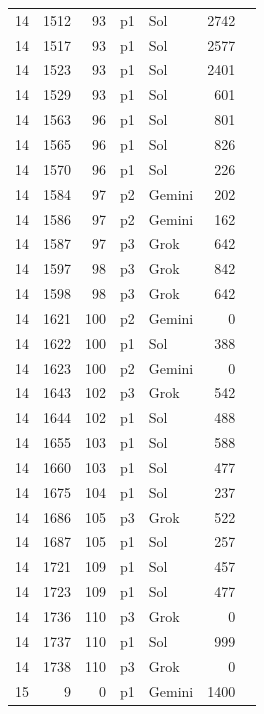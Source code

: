 \begin{longtable}{r r r l l r L{2.3in}}
14 & 1512 & 93 & p1 & Sol & 2742 &  \\
14 & 1517 & 93 & p1 & Sol & 2577 &  \\
14 & 1523 & 93 & p1 & Sol & 2401 &  \\
14 & 1529 & 93 & p1 & Sol & 601 &  \\
14 & 1563 & 96 & p1 & Sol & 801 &  \\
14 & 1565 & 96 & p1 & Sol & 826 &  \\
14 & 1570 & 96 & p1 & Sol & 226 &  \\
14 & 1584 & 97 & p2 & Gemini & 202 &  \\
14 & 1586 & 97 & p2 & Gemini & 162 &  \\
14 & 1587 & 97 & p3 & Grok & 642 &  \\
14 & 1597 & 98 & p3 & Grok & 842 &  \\
14 & 1598 & 98 & p3 & Grok & 642 &  \\
14 & 1621 & 100 & p2 & Gemini & 0 &  \\
14 & 1622 & 100 & p1 & Sol & 388 &  \\
14 & 1623 & 100 & p2 & Gemini & 0 &  \\
14 & 1643 & 102 & p3 & Grok & 542 &  \\
14 & 1644 & 102 & p1 & Sol & 488 &  \\
14 & 1655 & 103 & p1 & Sol & 588 &  \\
14 & 1660 & 103 & p1 & Sol & 477 &  \\
14 & 1675 & 104 & p1 & Sol & 237 &  \\
14 & 1686 & 105 & p3 & Grok & 522 &  \\
14 & 1687 & 105 & p1 & Sol & 257 &  \\
14 & 1721 & 109 & p1 & Sol & 457 &  \\
14 & 1723 & 109 & p1 & Sol & 477 &  \\
14 & 1736 & 110 & p3 & Grok & 0 &  \\
14 & 1737 & 110 & p1 & Sol & 999 &  \\
14 & 1738 & 110 & p3 & Grok & 0 &  \\
15 & 9 & 0 & p1 & Gemini & 1400 &  \\

\end{longtable}
